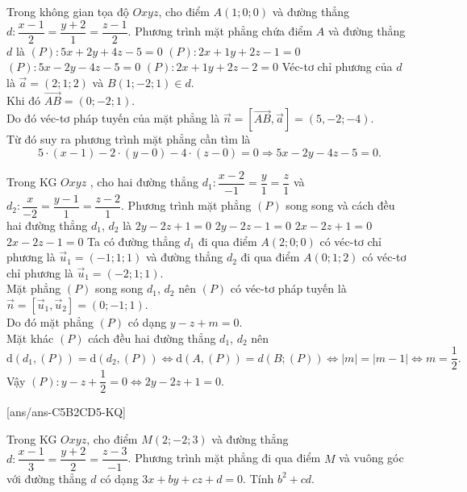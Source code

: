 \begin{ex}%
	Trong không gian tọa độ $ Oxyz$, cho điểm $A(1;0;0)$ và đường thẳng \break $ d\colon\dfrac{x-1}{2}=\dfrac{y+2}{1}=\dfrac{z-1}{2}$. Phương trình mặt phẳng chứa điểm $A$ và đường thẳng $d$ là
	\choice
	{$(P)\colon 5x+2y+4z-5=0$}
	{$(P)\colon 2x+1y+2z-1=0$}
	{\True $(P)\colon 5x-2y-4z-5=0$}
	{$(P)\colon 2x+1y+2z-2=0$}
	\loigiai
	{
		Véc-tơ chỉ phương của $ d$ là $\overrightarrow{a}=(2; 1; 2)$ và $ B(1; -2; 1)\in d$.\\
		Khi đó $\overrightarrow{AB}=(0; -2; 1)$.\\
		Do đó véc-tơ pháp tuyến của mặt phẳng là $\overrightarrow{n}=\left[\overrightarrow{AB},\overrightarrow{a}\right]=(5,-2;-4)$.\\
		Từ đó suy ra phương trình mặt phẳng cần tìm là $$ 5\cdot(x-1)-2\cdot(y-0)-4\cdot(z-0)=0\Rightarrow 5x-2y-4z-5=0.$$}
\end{ex}

\begin{ex}%
	Trong KG $Oxyz$ , cho hai đường thẳng $d_1\colon\dfrac{x-2}{-1}=\dfrac{y}{1}=\dfrac{z}{1}$ và $d_2\colon\dfrac{x}{-2}=\dfrac{y-1}{1}=\dfrac{z-2}{1}$. Phương trình mặt phẳng $(P)$ song song và cách đều hai đường thẳng $d_1$, ${d_2}$ là
	\choice
	{\True $ 2y-2z+1=0$}
	{$ 2y-2z-1=0$}
	{$2x-2z+1=0$}
	{$2x-2z-1=0$}
	\loigiai
	{
		Ta có đường thẳng $d_1$ đi qua điểm $ A(2;0;0)$ có véc-tơ chỉ phương là $\overrightarrow{u}_1=(-1;1;1)$ và đường thẳng $d_2$ đi qua điểm $ A(0;1;2)$ có véc-tơ chỉ phương là $\overrightarrow{u}_1=(-2; 1; 1)$.\\
		Mặt phẳng $(P)$ song song $d_1$, ${d_2}$ nên $(P)$ có véc-tơ pháp tuyến là $\overrightarrow{n}=\left[\overrightarrow{u}_1,\overrightarrow{u}_2\right]=(0;-1;1)$.\\
		Do đó mặt phẳng $(P)$ có dạng $ y-z+m=0$.\\
		Mặt khác $(P)$ cách đều hai đường thẳng $d_1$, ${d_2}$ nên\\
		$$ \mathrm{d}\left(d_1,(P)\right)=\mathrm{d}\left(d_2,(P)\right)\Leftrightarrow \mathrm{d}\left(A,(P)\right)=d\left(B;(P)\right)\Leftrightarrow\left| m\right|=\left| m-1\right|\Leftrightarrow m=\dfrac{1}{2}.$$
		Vậy $(P)\colon y-z+\dfrac{1}{2}=0\Leftrightarrow 2y-2z+1=0$.}
\end{ex}
\TNSA
{}[ans/ans-C5B2CD5-KQ]
\begin{ex}%
	Trong KG $Oxyz$, cho điểm $M(2; -2; 3)$ và đường thẳng \break $d\colon \dfrac{x-1}{3}=\dfrac{y+2}{2}=\dfrac{z-3}{-1}$. Phương trình mặt phẳng đi qua điểm $M$ và vuông góc với đường thẳng $d$ có dạng $3x+by+cz+d=0$. Tính $b^2+cd$.
\end{ex}

